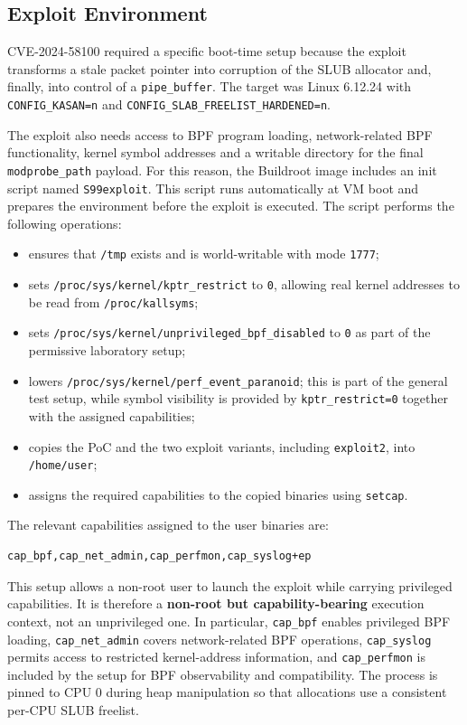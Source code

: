 \documentclass[../main.tex]{subfiles}
\begin{document}
\subsection{Exploit Environment}
CVE-2024-58100 required a specific boot-time setup because the exploit transforms a stale packet pointer into corruption of the SLUB allocator and, finally, into control of a \texttt{pipe\_buffer}. The target was Linux 6.12.24 with \texttt{CONFIG\_KASAN=n} and \texttt{CONFIG\_SLAB\_FREELIST\_HARDENED=n}.

The exploit also needs access to BPF program loading, network-related BPF functionality, kernel symbol addresses and a writable directory for the final \texttt{modprobe\_path} payload.
For this reason, the Buildroot image includes an init script named \texttt{S99exploit}. This script runs automatically at VM boot and prepares the environment before the exploit is executed.
The script performs the following operations:
\begin{itemize}
    \item ensures that \texttt{/tmp} exists and is world-writable with mode \texttt{1777};
    \item sets \texttt{/proc/sys/kernel/kptr\_restrict} to \texttt{0}, allowing real kernel addresses to be read from \texttt{/proc/kallsyms};
    \item sets \texttt{/proc/sys/kernel/unprivileged\_bpf\_disabled} to \texttt{0} as part of the permissive laboratory setup;
    \item lowers \texttt{/proc/sys/kernel/perf\_event\_paranoid}; this is part of the general test setup, while symbol visibility is provided by \texttt{kptr\_restrict=0} together with the assigned capabilities;
    \item copies the PoC and the two exploit variants, including \texttt{exploit2}, into \texttt{/home/user};
    \item assigns the required capabilities to the copied binaries using \texttt{setcap}.
\end{itemize}
The relevant capabilities assigned to the user binaries are:
\begin{lstlisting}[language=bash, caption={Capabilities assigned by S99exploit.}]
cap_bpf,cap_net_admin,cap_perfmon,cap_syslog+ep
\end{lstlisting}
This setup allows a non-root user to launch the exploit while carrying privileged capabilities. It is therefore a \textbf{non-root but capability-bearing} execution context, not an unprivileged one. In particular, \texttt{cap\_bpf} enables privileged BPF loading, \texttt{cap\_net\_admin} covers network-related BPF operations, \texttt{cap\_syslog} permits access to restricted kernel-address information, and \texttt{cap\_perfmon} is included by the setup for BPF observability and compatibility. The process is pinned to CPU 0 during heap manipulation so that allocations use a consistent per-CPU SLUB freelist.
\end{document}
